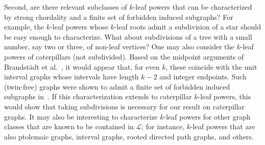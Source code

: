 \documentclass[11pt,letter]{article}
\theoremstyle{remark}
\renewcommand{\L}{\mathcal{L}}
\begin{document}
Second, are there relevant subclasses of $k$-leaf powers that can be characterized by strong chordality and a finite set of forbidden induced subgraphs?  For example, the $k$-leaf powers whose $k$-leaf roots admit a subdivision of a star should be easy enough to characterize. What about subdivisions of a tree with a small number, say two or three, of non-leaf vertices?   
One may also consider the $k$-leaf powers of caterpillars (not subdivided). Based on the midpoint arguments of Brandstädt et al.~\cite[Theorem 6]{BRANDSTADT2010897}, it would appear that, for even $k$, these coincide with the unit interval graphs whose intervals have length $k-2$ and integer endpoints.  Such (twin-free) graphs were shown to admit a finite set of forbidden induced subgraphs in~\cite{duran2015unit}. If this characterization extends to caterpillar $k$-leaf powers, this would show that taking subdivisions is necessary for our result on caterpillar graphs. 
It may also be interesting to characterize $k$-leaf powers for other graph classes that are known to be contained in $\L$; for instance, $k$-leaf powers that are also ptolemaic graphs, interval graphs, rooted directed path graphs, and others. 




 









\end{document}
